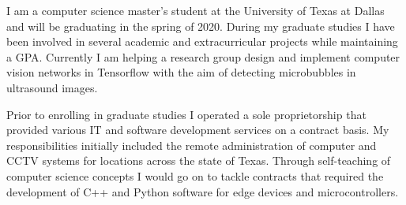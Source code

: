 \begin{cvletter}

	I am a computer science master's student at the University
	of Texas at Dallas and will be graduating in the spring of 2020. 
  During my graduate studies I have been involved in several academic and
  extracurricular projects while maintaining a \gpa{} GPA. Currently I am
  helping a research group design and implement computer vision networks 
  in Tensorflow with the aim of detecting microbubbles in ultrasound images.

  Prior to enrolling in graduate studies I operated a sole proprietorship
	that provided various IT and software development services on a
	contract basis. My responsibilities initially included
	the remote administration of computer and CCTV systems for locations
	across the state of Texas. 
	Through self-teaching of computer science concepts I would go on
	to tackle contracts that required the development of C++ and Python 
  software for edge devices and microcontrollers.

\end{cvletter}
